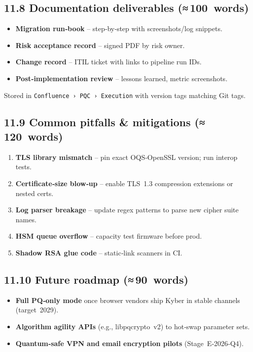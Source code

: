 \documentclass[
  english,
]{article}
\providecommand{\tightlist}{%
  \setlength{\itemsep}{0pt}\setlength{\parskip}{0pt}}
\begin{document}
\subsection{11.8 Documentation deliverables
(≈\,100~words)}\label{documentation-deliverables-100-words}

\begin{itemize}
\tightlist
\item
  \textbf{Migration run‑book} -- step‑by‑step with screenshots/log
  snippets.
\item
  \textbf{Risk acceptance record} -- signed PDF by risk owner.
\item
  \textbf{Change record} -- ITIL ticket with links to pipeline run IDs.
\item
  \textbf{Post‑implementation review} -- lessons learned, metric
  screenshots.
\end{itemize}

Stored in \texttt{Confluence\ ›~PQC\ ›~Execution} with version tags
matching Git tags.

\subsection{11.9 Common pitfalls \& mitigations
(≈\,120~words)}\label{common-pitfalls-mitigations-120-words}

\begin{enumerate}
\def\labelenumi{\arabic{enumi}.}
\tightlist
\item
  \textbf{TLS library mismatch} -- pin exact OQS‑OpenSSL version; run
  interop tests.
\item
  \textbf{Certificate‑size blow‑up} -- enable TLS~1.3 compression
  extensions or nested certs.
\item
  \textbf{Log parser breakage} -- update regex patterns to parse new
  cipher suite names.
\item
  \textbf{HSM queue overflow} -- capacity test firmware before prod.
\item
  \textbf{Shadow RSA glue code} -- static‑link scanners in CI.
\end{enumerate}

\subsection{11.10 Future roadmap
(≈\,90~words)}\label{future-roadmap-90-words}

\begin{itemize}
\tightlist
\item
  \textbf{Full PQ‑only mode} once browser vendors ship Kyber in stable
  channels (target~2029).
\item
  \textbf{Algorithm agility APIs} (e.g., libpqcrypto~v2) to hot‑swap
  parameter sets.
\item
  \textbf{Quantum‑safe VPN and email encryption pilots}
  (Stage~E‑2026‑Q4).
\end{itemize}
\end{document}
